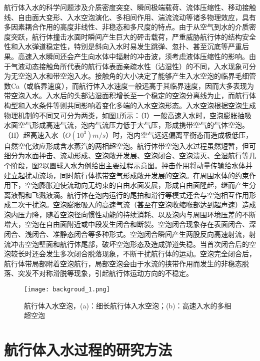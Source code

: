 航行体入水的科学问题涉及介质密度突变、瞬间极端载荷、流体压缩性、移动接触线、自由面大变形、入水空泡演化、多相间作用、湍流流动等诸多物理效应，具有多因素耦合作用的高度非线性、非稳态和多尺度的特点。由于从空气到水的介质密度突跃，航行体撞击水面时瞬间产生巨大的砰击载荷，严重威胁航行体的结构安全性和入水弹道稳定性，特别是斜向入水时易发生跳弹、忽扑、甚至沉底等严重后果。高速入水瞬间还会产生向水体中辐射的冲击波，须考虑液体压缩性的影响。由于气液动态接触角所代表的航行体表面亲疏水性（沾湿性）的不同，入水现象可分为无空泡入水和带空泡入水。接触角的大小决定了能够产生入水空泡的临界毛细管数Ca（或临界速度），而航行体入水速度一般远高于其临界速度，因而大多表现为带空泡入水。入水后的头部沾湿面积增长至一个稳定的空泡分离线为止，而航行体构型和入水条件等则共同影响着变化多端的入水空泡形态。入水空泡根据空泡生成物理机制的不同又可分为两类\cite{truscott2014water}，如图\ref{fig:background}所示：（I）一般高速入水时，空泡膨胀抽吸水面空气形成高速气流，泡内气流压力低于大气压，形成携带空气的气体空泡。（II）超高速入水（$O(10^3) m/s$）时，泡内空气远远偏离平衡态而造成极低压，自然空化效应形成含水蒸汽的两相超空泡。航行体带空泡入水过程虽然短暂，但可细分为水面抨击、流动形成、空泡敞开发展、空泡闭合、空泡溃灭、全湿航行等几个阶段，图2以圆球入水为例给出主要过程示意图。抨击作用将动量传输给水体并建立起扰动流场，同时航行体携带空气形成敞开发展的空泡。在周围水体的约束作用下，空泡膨胀迫使流动向无约束的自由水面发展，形成自由面隆起，继而产生分离液鞘和飞溅液滴。航行体在泡内运行的尾拍和滑行等模式还会与空泡相互作用形成二次干扰泡。空泡膨胀吸入的高速气流（甚至在空泡收缩喉部达到超声速\cite{gekle2010supersonic}）造成泡内压力降，随着空泡径向惯性动能的持续消耗、以及泡内与周围环境压差的不断增大，空泡在自由面附近或中段发生闭合和断裂。空泡闭合现象存在表面闭合、深闭合、浅闭合、准静态闭合等多种形式。空泡闭合瞬间产生两股反向高速射流，射流冲击空泡壁面和航行体尾部，破坏空泡形态及造成弹道失稳。当首次闭合后的空泡较长时还会发生多次闭合脱落现象，不断干扰航行体的运动。空泡完全闭合后，航行体带局部附着空泡航行，局部空泡会由于水流的挟带作用而发生的非稳态脱落、突发不对称滑脱等现象，引起航行体运动方向的不稳定。

\begin{figure}[!htp]
  \centering 
  \texttt{[image: backgroud\_1.png]}
  \caption{航行体入水空泡，(a)：细长航行体入水空泡；(b)：高速入水的多相超空泡}
  \label{fig:background}
\end{figure}

\section{航行体入水过程的研究方法}

